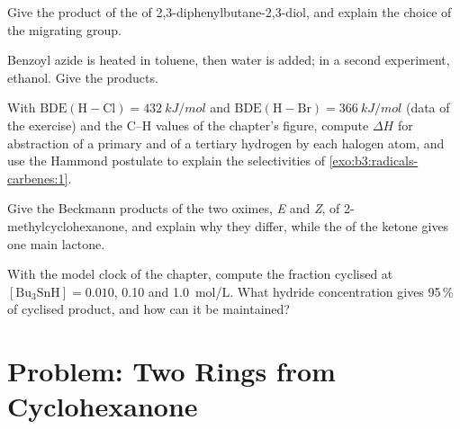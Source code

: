 \begin{exercise}[$\star\star$]\label{exo:b3:radicals-carbenes:8}
Give the product of the  of 2,3-diphenylbutane-2,3-diol,
and explain the choice of the migrating group.
\end{exercise}

\begin{exercise}[$\star\star$]\label{exo:b3:radicals-carbenes:9}
Benzoyl azide is heated in toluene, then water is added; in a second experiment,
ethanol. Give the products.
\end{exercise}

\begin{exercise}[$\star\star\star$]\label{exo:b3:radicals-carbenes:10}
With $\mathrm{BDE(H{-}Cl)} = \qty{432}{kJ/mol}$ and $\mathrm{BDE(H{-}Br)} = \qty{366}{kJ/mol}$ (data of the exercise) and the C--H values of
the chapter's figure, compute $\Delta H$ for abstraction of a primary and of a tertiary
hydrogen by each halogen atom, and use the Hammond postulate to explain the
selectivities of \cref{exo:b3:radicals-carbenes:1}.
\end{exercise}

\begin{exercise}[$\star\star\star$]\label{exo:b3:radicals-carbenes:11}
Give the Beckmann products of the two oximes, \textit{E} and \textit{Z}, of 2-methylcyclohexanone,
and explain why they differ, while the  of the
ketone gives one main lactone.
\end{exercise}

\begin{exercise}[$\star\star\star$]\label{exo:b3:radicals-carbenes:12}
With the model clock of the chapter, compute the fraction cyclised at $[\mathrm{Bu_3SnH}] = 0.010$,
0.10 and \qty{1.0}{mol/L}. What hydride concentration gives 95\,\% of cyclised product, and how
can it be maintained?
\end{exercise}

\section{Problem: Two Rings from Cyclohexanone}

